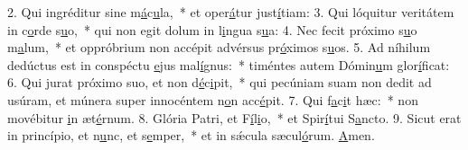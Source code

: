 2. Qui ingréditur sine m\uline{á}c\uline{u}la,~* et oper\uline{á}tur just\uline{í}tiam:
3. Qui lóquitur veritátem in c\uline{o}rde s\uline{u}o,~* qui non egit dolum in l\uline{i}ngua s\uline{u}a:
4. Nec fecit próximo s\uline{u}o m\uline{a}lum,~* et oppróbrium non accépit advérsus pr\uline{ó}ximos s\uline{u}os.
5. Ad níhilum dedúctus est in conspéctu \uline{e}jus mal\uline{í}gnus:~* timéntes autem Dómin\uline{u}m glor\uline{í}ficat:
6. Qui jurat próximo suo, et non d\uline{é}c\uline{i}pit,~* qui pecúniam suam non dedit ad usúram, et múnera super innocéntem n\uline{o}n acc\uline{é}pit.
7. Qui f\uline{a}c\uline{i}t hæc:~* non movébitur \uline{i}n æt\uline{é}rnum.
8. Glória Patri, et F\uline{í}l\uline{i}o,~* et Spir\uline{í}tui S\uline{a}ncto.
9. Sicut erat in princípio, et n\uline{u}nc, et s\uline{e}mper,~* et in sǽcula sæcul\uline{ó}rum. \uline{A}men.
